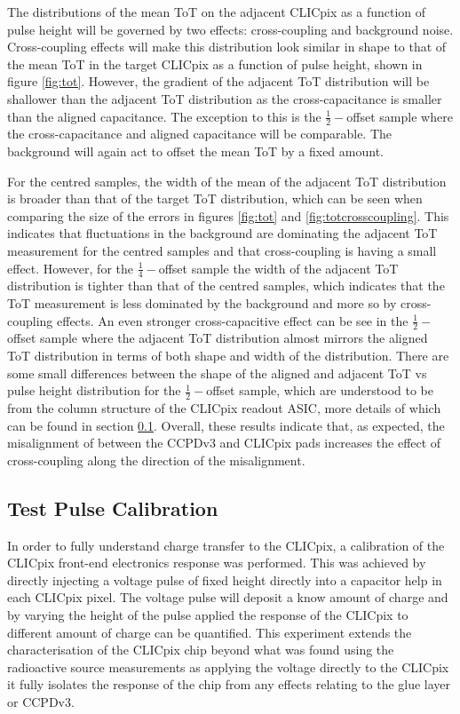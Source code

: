 The distributions of the mean ToT on the adjacent CLICpix as a function of pulse height will be governed by two effects: cross-coupling and background noise.  Cross-coupling effects will make this distribution look similar in shape to that of the mean ToT in the target CLICpix as a function of pulse height, shown in figure \ref{fig:tot}.  However, the gradient of the adjacent ToT distribution will be shallower than the adjacent ToT distribution as the cross-capacitance is smaller than the aligned capacitance.  The exception to this is the $\frac{1}{2}-$offset sample where the cross-capacitance and aligned capacitance will be comparable.  The background will again act to offset the mean ToT by a fixed amount.  

For the centred samples, the width of the mean of the adjacent ToT distribution is broader than that of the target ToT distribution, which can be seen when comparing the size of the errors in figures \ref{fig:tot} and \ref{fig:totcrosscoupling}.  This indicates that fluctuations in the background are dominating the adjacent ToT measurement for the centred samples and that cross-coupling is having a small effect.  However, for the $\frac{1}{4}-$offset sample the width of the adjacent ToT distribution is tighter than that of the centred samples, which indicates that the ToT measurement is less dominated by the background and more so by cross-coupling effects.  An even stronger cross-capacitive effect can be see in the $\frac{1}{2}-$offset sample where the adjacent ToT distribution almost mirrors the aligned ToT distribution in terms of both shape and width of the distribution.  There are some small differences between the shape of the aligned and adjacent ToT vs pulse height distribution for the $\frac{1}{2}-$offset sample, which are understood to be from the column structure of the CLICpix readout ASIC, more details of which can be found in section \ref{sec:testpulsecalibration}.  Overall, these results indicate that, as expected, the misalignment of between the CCPDv3 and CLICpix pads increases the effect of cross-coupling along the direction of the misalignment.


\subsection{Test Pulse Calibration}
\label{sec:testpulsecalibration}

In order to fully understand charge transfer to the CLICpix, a calibration of the CLICpix front-end electronics response was performed.  This was achieved by directly injecting a voltage pulse of fixed height directly into a capacitor help in each CLICpix pixel.  The voltage pulse will deposit a know amount of charge and by varying the height of the pulse applied the response of the CLICpix to different amount of charge can be quantified.  This experiment extends the characterisation of the CLICpix chip beyond what was found using the radioactive source measurements as applying the voltage directly to the CLICpix it fully isolates the response of the chip from any effects relating to the glue layer or CCPDv3.  

